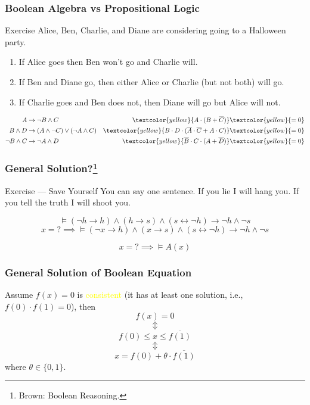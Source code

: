\documentclass[UTF8,aspectratio=43,11pt,colorlinks,compress,openany]{beamer}%
\begin{document}
\begin{frame}\frametitle{Boolean Algebra vs Propositional Logic}
	\begin{block}{Exercise}
		Alice, Ben, Charlie, and Diane are considering going to a
		Halloween party.
		\begin{enumerate}
			\item If Alice goes then Ben won't go and Charlie will.
			\item If Ben and Diane go, then either Alice or Charlie (but not both) will go.
			\item If Charlie goes and Ben does not, then Diane will go but Alice will not.
		\end{enumerate}
	\end{block}
	\begin{align*}
	A&\to\neg B\wedge C &\textcolor{yellow}{A\cdot(B+\overline{C})}&\textcolor{yellow}{=0}\\
	B\wedge D&\to(A\wedge\neg C)\vee(\neg A\wedge C) &\textcolor{yellow}{B\cdot D\cdot(\overline{A}\cdot\overline{C}+A\cdot C)}&\textcolor{yellow}{=0}\\
	\neg B\wedge C&\to\neg A\wedge D &\textcolor{yellow}{\overline{B}\cdot C\cdot(A+\overline{D})}&\textcolor{yellow}{=0}
	\end{align*}
\end{frame}

\begin{frame}\frametitle{General Solution?\footnote{Brown: Boolean Reasoning.}}
	\begin{block}{Exercise --- Save Yourself}
		You can say one sentence. If you lie I will hang you. If you tell the truth I will shoot you.
	\end{block}
	\[\vDash(\neg h\to h)\wedge(h\to s)\wedge(s\leftrightarrow\neg h)\to\neg h\wedge\neg s\]
	\[x=?\implies\vDash(\neg x\to h)\wedge(x\to s)\wedge(s\leftrightarrow\neg h)\to\neg h\wedge\neg s\]
	\begin{problem}
		\[x=?\implies\vDash A(x)\]
	\end{problem}
\end{frame}

\begin{frame}\frametitle{General Solution of Boolean Equation}
	\begin{theorem}
		Assume $f(x)=0$ is \textcolor{yellow}{consistent} (it has at least one solution, i.e., $f(0)\cdot f(1)=0$), then
		\[f(x)=0\]
		\[\Updownarrow\]
		\[f(0)\leq x\leq\overline{f(1)}\]
		\[\Updownarrow\]
		\[x=f(0)+\theta\cdot\overline{f(1)}\]
		where $\theta\in\{0,1\}$.
	\end{theorem}
\end{frame}
\end{document}
